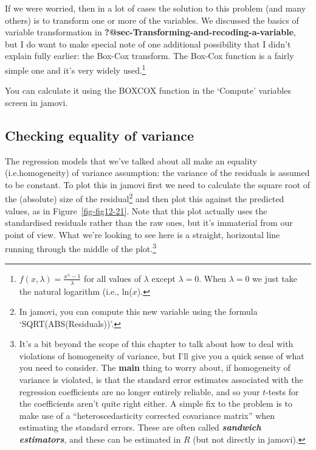 \documentclass[
  a4paper,
]{book}
\begin{document}
If we were worried, then in a lot of cases the solution to this problem
(and many others) is to transform one or more of the variables. We
discussed the basics of variable transformation in
\textbf{?@sec-Transforming-and-recoding-a-variable}, but I do want to
make special note of one additional possibility that I didn't explain
fully earlier: the Box-Cox transform. The Box-Cox function is a fairly
simple one and it's very widely used.\footnote{\(f(x,\lambda)=\frac{x^{\lambda}-1}{\lambda}\)
  for all values of \(\lambda\) except \(\lambda = 0\). When
  \(\lambda = 0\) we just take the natural logarithm (i.e., ln(\(x\)).}

You can calculate it using the BOXCOX function in the `Compute'
variables screen in jamovi.

\hypertarget{checking-equality-of-variance}{%
\subsection{Checking equality of
variance}\label{checking-equality-of-variance}}

The regression models that we've talked about all make an equality
(i.e.homogeneity) of variance assumption: the variance of the residuals
is assumed to be constant. To plot this in jamovi first we need to
calculate the square root of the (absolute) size of the
residual\footnote{In jamovi, you can compute this new variable using the
  formula `SQRT(ABS(Residuals))'.} and then plot this against the
predicted values, as in Figure~\ref{fig-fig12-21}. Note that this plot
actually uses the standardised residuals rather than the raw ones, but
it's immaterial from our point of view. What we're looking to see here
is a straight, horizontal line running through the middle of the
plot.\footnote{It's a bit beyond the scope of this chapter to talk about
  how to deal with violations of homogeneity of variance, but I'll give
  you a quick sense of what you need to consider. The \textbf{main}
  thing to worry about, if homogeneity of variance is violated, is that
  the standard error estimates associated with the regression
  coefficients are no longer entirely reliable, and so your \(t\)-tests
  for the coefficients aren't quite right either. A simple fix to the
  problem is to make use of a ``heteroscedasticity corrected covariance
  matrix'' when estimating the standard errors. These are often called
  \textbf{\emph{sandwich estimators}}, and these can be estimated in
  \(R\) (but not directly in jamovi).}
\end{document}

